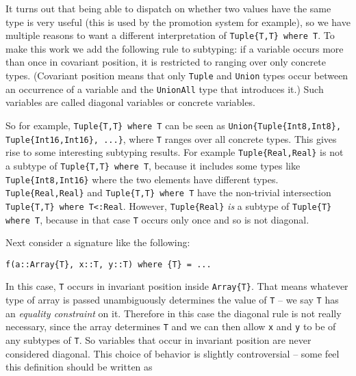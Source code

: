 It turns out that being able to dispatch on whether two values have the same type is very useful (this is used by the promotion system for example), so we have multiple reasons to want a different interpretation of \texttt{Tuple\{T,T\} where T}. To make this work we add the following rule to subtyping: if a variable occurs more than once in covariant position, it is restricted to ranging over only concrete types. ({\textquotedbl}Covariant position{\textquotedbl} means that only \texttt{Tuple} and \texttt{Union} types occur between an occurrence of a variable and the \texttt{UnionAll} type that introduces it.) Such variables are called {\textquotedbl}diagonal variables{\textquotedbl} or {\textquotedbl}concrete variables{\textquotedbl}.



So for example, \texttt{Tuple\{T,T\} where T} can be seen as \texttt{Union\{Tuple\{Int8,Int8\}, Tuple\{Int16,Int16\}, ...\}}, where \texttt{T} ranges over all concrete types. This gives rise to some interesting subtyping results. For example \texttt{Tuple\{Real,Real\}} is not a subtype of \texttt{Tuple\{T,T\} where T}, because it includes some types like \texttt{Tuple\{Int8,Int16\}} where the two elements have different types. \texttt{Tuple\{Real,Real\}} and \texttt{Tuple\{T,T\} where T} have the non-trivial intersection \texttt{Tuple\{T,T\} where T<:Real}. However, \texttt{Tuple\{Real\}} \emph{is} a subtype of \texttt{Tuple\{T\} where T}, because in that case \texttt{T} occurs only once and so is not diagonal.



Next consider a signature like the following:




\begin{verbatim}
f(a::Array{T}, x::T, y::T) where {T} = ...
\end{verbatim}



In this case, \texttt{T} occurs in invariant position inside \texttt{Array\{T\}}. That means whatever type of array is passed unambiguously determines the value of \texttt{T} – we say \texttt{T} has an \emph{equality constraint} on it. Therefore in this case the diagonal rule is not really necessary, since the array determines \texttt{T} and we can then allow \texttt{x} and \texttt{y} to be of any subtypes of \texttt{T}. So variables that occur in invariant position are never considered diagonal. This choice of behavior is slightly controversial – some feel this definition should be written as




